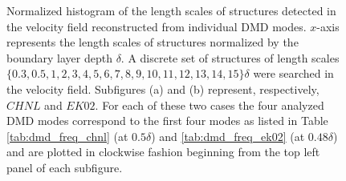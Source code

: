 \begin{figure}[htb]
\begin{minipage}{\textwidth}
\begin{picture}
	\end{picture}
	\end{minipage}
\caption{Normalized histogram of the length scales of structures detected in the velocity field reconstructed from individual DMD modes. $x$-axis represents the length scales of structures normalized by the boundary layer depth $\delta$. A discrete set of structures of length scales $ \{ 0.3, 0.5, 1, 2 , 3, 4, 5, 6, 7, 8, 9, 10, 11, 12, 13, 14, 15 \} \delta$ were searched in the velocity field. Subfigures (a) and (b) represent, respectively, $CHNL$ and  $EK02$. For each of these two cases the four analyzed DMD modes correspond to the first four modes as listed in Table \ref{tab:dmd_freq_chnl} (at $0.5\delta$) and \ref{tab:dmd_freq_ek02} (at $0.48\delta$) and are plotted in clockwise fashion beginning from the top left panel of each subfigure.}	
\label{fig:dmd_length_scale_dist}
\end{figure}
